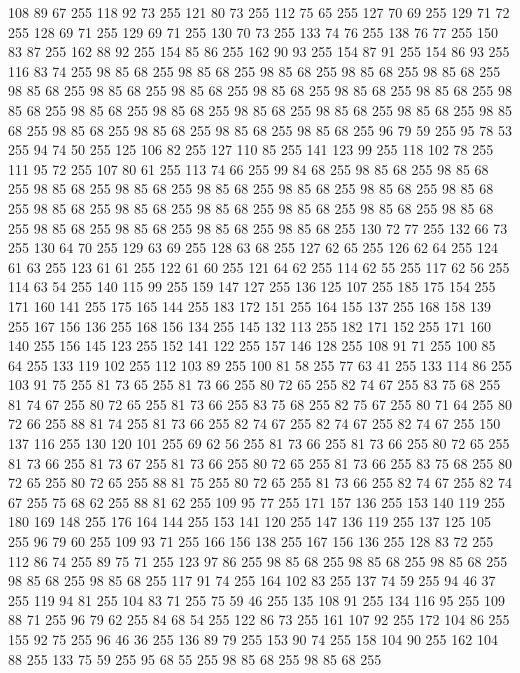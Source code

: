 108 89 67 255 118 92 73 255 121 80 73 255 112 75 65 255 127 70 69 255 129 71 72 255 128 69 71 255 129 69 71 255 130 70 73 255 133 74 76 255 138 76 77 255 150 83 87 255 162 88 92 255 154 85 86 255 162 90 93 255 154 87 91 255 154 86 93 255 116 83 74 255 98 85 68 255 98 85 68 255 98 85 68 255 98 85 68 255 98 85 68 255 98 85 68 255 98 85 68 255 98 85 68 255 98 85 68 255 98 85 68 255 98 85 68 255 98 85 68 255 98 85 68 255 98 85 68 255 98 85 68 255 98 85 68 255 98 85 68 255 98 85 68 255 98 85 68 255 98 85 68 255 98 85 68 255 98 85 68 255 96 79 59 255 95 78 53 255 94 74 50 255 125 106 82 255 127 110 85 255 141 123 99 255 118 102 78 255 111 95 72 255 107 80 61 255 113 74 66 255 99 84 68 255 98 85 68 255 98 85 68 255 98 85 68 255 98 85 68 255 98 85 68 255 98 85 68 255 98 85 68 255 98 85 68 255 98 85 68 255 98 85 68 255 98 85 68 255 98 85 68 255 98 85 68 255
98 85 68 255 98 85 68 255 98 85 68 255 98 85 68 255 98 85 68 255 130 72 77 255 132 66 73 255 130 64 70 255 129 63 69 255 128 63 68 255 127 62 65 255 126 62 64 255 124 61 63 255 123 61 61 255 122 61 60 255 121 64 62 255 114 62 55 255 117 62 56 255 114 63 54 255 140 115 99 255 159 147 127 255 136 125 107 255 185 175 154 255 171 160 141 255 175 165 144 255 183 172 151 255 164 155 137 255 168 158 139 255 167 156 136 255 168 156 134 255 145 132 113 255 182 171 152 255 171 160 140 255 156 145 123 255 152 141 122 255 157 146 128 255 108 91 71 255 100 85 64 255 133 119 102 255 112 103 89 255 100 81 58 255 77 63 41 255 133 114 86 255 103 91 75 255 81 73 65 255 81 73 66 255 80 72 65 255 82 74 67 255 83 75 68 255 81 74 67 255 80 72 65 255 81 73 66 255 83 75 68 255 82 75 67 255 80 71 64 255 80 72 66 255 88 81 74 255 81 73 66 255 82 74 67 255 82 74 67 255 82 74 67 255 150 137 116 255 130 120 101 255 69 62 56 255
81 73 66 255 81 73 66 255 80 72 65 255 81 73 66 255 81 73 67 255 81 73 66 255 80 72 65 255 81 73 66 255 83 75 68 255 80 72 65 255 80 72 65 255 88 81 75 255 80 72 65 255 81 73 66 255 82 74 67 255 82 74 67 255 75 68 62 255 88 81 62 255 109 95 77 255 171 157 136 255 153 140 119 255 180 169 148 255 176 164 144 255 153 141 120 255 147 136 119 255 137 125 105 255 96 79 60 255 109 93 71 255 166 156 138 255 167 156 136 255 128 83 72 255 112 86 74 255 89 75 71 255 123 97 86 255 98 85 68 255 98 85 68 255 98 85 68 255 98 85 68 255 98 85 68 255 117 91 74 255 164 102 83 255 137 74 59 255 94 46 37 255 119 94 81 255 104 83 71 255 75 59 46 255 135 108 91 255 134 116 95 255 109 88 71 255 96 79 62 255 84 68 54 255 122 86 73 255 161 107 92 255 172 104 86 255 155 92 75 255 96 46 36 255 136 89 79 255 153 90 74 255 158 104 90 255 162 104 88 255 133 75 59 255 95 68 55 255 98 85 68 255 98 85 68 255
